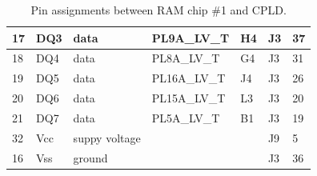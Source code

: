 \documentclass{article}
\begin{document}
\begin{table}
\begin{tabular}{|l|l|l|l|l|l|l|}
	\hline
	17 & DQ3 & data & PL9A\_LV\_T & H4 & J3 & 37 \\
	\hline
	18 & DQ4 & data & PL8A\_LV\_T & G4 & J3 & 31 \\
	\hline
	19 & DQ5 & data & PL16A\_LV\_T & J4 & J3 & 26 \\
	\hline
	20 & DQ6 & data & PL15A\_LV\_T & L3 & J3 & 20 \\
	\hline
	21 & DQ7 & data & PL5A\_LV\_T & B1 & J3 & 19 \\
	\hline
	32 & Vcc & suppy voltage & & & J9 & 5 \\
	\hline
	16 & Vss & ground & & & J3 & 36 \\
	\hline
\end{tabular}
\caption{Pin assignments between RAM chip \#1 and CPLD.}
\end{table}
\end{document}
